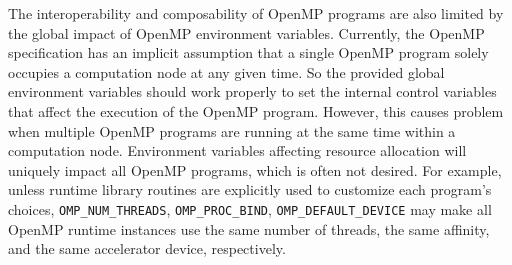 The interoperability and composability of OpenMP programs are also limited by the global impact of OpenMP environment variables.
Currently, the OpenMP specification has an implicit assumption that a single OpenMP program solely occupies a computation node at any given time.
So the provided global environment variables should work properly to set the internal control variables that affect the execution
of the OpenMP program. 
However, this causes problem when multiple OpenMP programs are running at the same time within a computation node. 
Environment variables affecting resource allocation will uniquely impact all OpenMP programs, which is often not desired.
For example, unless runtime library routines are explicitly used to customize each program's choices, \lstinline{OMP_NUM_THREADS}, \lstinline{OMP_PROC_BIND}, \lstinline{OMP_DEFAULT_DEVICE} may 
make all OpenMP runtime instances use the same number of threads, the same affinity, and the same accelerator device, respectively. 
